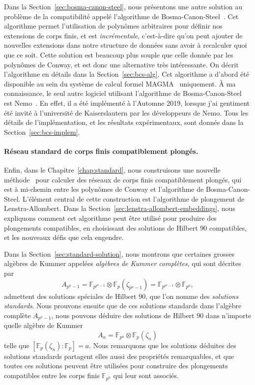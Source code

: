 Dans la Section~\ref{sec:bosma-canon-steel}, nous présentons une autre solution
au problème de la compatibilité appelé l'algorithme de
Bosma-Canon-Steel~\cite{BCS97}. Cet algorithme permet l'utilisation de polynômes
arbitraires pour définir nos extensions de corps finis, et est
\emph{incrémentale}, c'est-à-dire qu'on peut ajouter de nouvelles extensions
dans notre structure de données sans avoir à recalculer quoi que ce soit. Cette
solution est beaucoup plus souple que celle donnée par les polynômes de Conway,
et est donc une alternative très intéressante. On décrit l'algorithme en détails
dans la Section~\ref{sec:bcs-alg}. Cet algorithme a d'abord été disponible au
sein du système de calcul formel MAGMA~\cite{Magma} uniquement. À ma
connaissance, le seul autre logiciel utilisant l'algorithme de Bosma-Canon-Steel
est Nemo~\cite{Nemo}. En effet, il a été implémenté à l'Automne 2019, lorsque
j'ai gentiment été invité à l'université de Kaiserslautern par les
développeurs de Nemo. Tous les détails de l'implémentation, et les résultats
expérimentaux, sont donnés dans la Section~\ref{sec:bcs-implem}.

\paragraph{Réseau standard de corps finis compatiblement plongés.} Enfin, dans
le Chapitre~\ref{chap:standard}, nous construisons une nouvelle
méthode~\cite{DRR19} pour calculer des réseaux de corps finis compatiblement
plongés, qui est à mi-chemin entre les polynômes de Conway et l'algorithme de
Bosma-Canon-Steel. L'élément central de cette construction est l'algorithme de
plongement de Lenstra-Allombert. Dans la
Section~\ref{sec:lenstra-allombert-embeddings}, nous expliquons comment cet
algorithme peut être utilisé pour produire des plongements compatibles, en
choisissant des solutions de Hilbert $90$ compatibles, et les nouveaux défis que
cela engendre.

Dans la Section~\ref{sec:standard-solution}, nous montrons que certaines grosses
algèbres de Kummer appelées \emph{algèbres de Kummer complètes}, qui sont
décrites par
\[
  A_{p^a-1} = \mathbb{F}_{p^{p^a-1}}\otimes\mathbb{F}_{p}(\zeta_{p^a-1})
  = \mathbb{F}_{p^{p^a-1}}\otimes \mathbb{F}_{p^a},
\]
admettent des solutions spéciales de Hilbert $90$, que l'on nomme des
\emph{solutions standards}. Nous prouvons ensuite que de ces solutions standards
dans l'algèbre complète $A_{p^a-1}$, nous pouvons déduire des solutions de
Hilbert $90$ dans n'importe quelle algèbre de Kummer
\[
  A_n = \mathbb{F}_{p^n}\otimes \mathbb{F}_{p}(\zeta_n)
\]
telle que $\left[ \mathbb{F}_p(\zeta_n):\mathbb{F}_p \right]=a$. Nous remarquons
que les solutions déduites des solutions standards partagent elles aussi des
propriétés remarquables, et que toutes ces solutions peuvent être utilisées pour
construire des plongements compatibles entre les corps finis
$\mathbb{F}_{p^n}$ qui leur sont associés.

